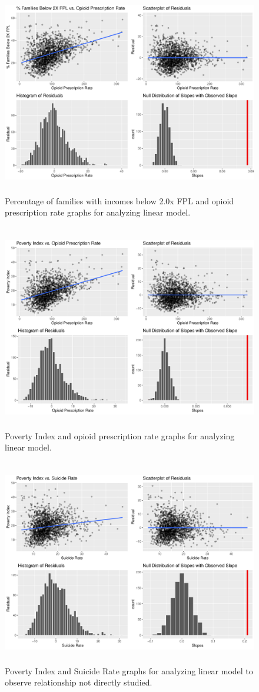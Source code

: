 \documentclass{article}
\newcommand{\<}{\langle}
\renewcommand{\>}{\rangle}
\theoremstyle{definition}
\begin{document}
\begin{figure}[H]
    \centering
    \includegraphics[height = 9cm]{P2_OPR.pdf}
    \caption{Percentage of families with incomes below 2.0x FPL and opioid prescription rate graphs for analyzing linear model.
}
    \label{fig:my_label}
\end{figure}
\begin{figure}[H]
    \centering
    \includegraphics[height = 9cm]{PI_OPR.pdf}
    \caption{Poverty Index and opioid prescription rate graphs for analyzing linear model.
}
    \label{fig:my_label}
\end{figure}
\begin{figure}[H]
    \centering
    \includegraphics[height = 9cm]{SR_PI.pdf}
    \caption{Poverty Index and Suicide Rate graphs for analyzing linear model to observe relationship not directly studied.
}
    \label{fig:my_label}
\end{figure}
\end{document}
